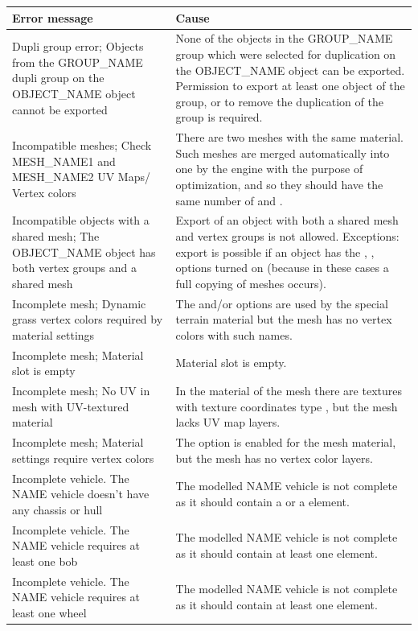 \documentclass[a4paper,12pt,oneside]{sphinxmanual}
\begin{document}
\begin{tabulary}{\linewidth}{|L|L|}
\hline
\textsf{\relax 
Error message
} & \textsf{\relax 
Cause
}\\
\hline
Dupli group error; Objects from
the GROUP\_NAME dupli group on
the OBJECT\_NAME object cannot be
exported
 & 
None of the objects in the GROUP\_NAME group which were selected for duplication on the OBJECT\_NAME object can be exported. Permission to export at least one object of the group, or to remove the duplication of the group is required.
\\

Incompatible meshes; Check
MESH\_NAME1 and MESH\_NAME2 UV Maps/
Vertex colors
 & 
There are two meshes with the same material. Such meshes are merged automatically into one by the engine with the purpose of optimization, and so they should have the same number of  and .
\\

Incompatible objects with
a shared mesh; The OBJECT\_NAME
object has both vertex groups and
a shared mesh
 & 
Export of an object with both a shared mesh and vertex groups is not allowed. Exceptions: export is possible if an object has the , ,  options turned on (because in these cases a full copying of meshes occurs).
\\

Incomplete mesh; Dynamic grass
vertex colors required
by material settings
 & 
The  and/or  options are used by the special terrain material but the mesh has no vertex colors with such names.
\\

Incomplete mesh; Material slot is
empty
 & 
Material slot is empty.
\\

Incomplete mesh; No UV in mesh
with UV-textured material
 & 
In the material of the mesh there are textures with texture coordinates type , but the mesh lacks UV map layers.
\\

Incomplete mesh; Material settings
require vertex colors
 & 
The  option is enabled for the mesh material, but the mesh has no vertex color layers.
\\

Incomplete vehicle. The NAME
vehicle doesn't have any chassis
or hull
 & 
The modelled NAME vehicle is not complete as it should contain a  or a  element.
\\

Incomplete vehicle. The NAME
vehicle requires at least one bob
 & 
The modelled NAME vehicle is not complete as it should contain at least one  element.
\\

Incomplete vehicle. The NAME
vehicle requires at least one wheel
 & 
The modelled NAME vehicle is not complete as it should contain at least one  element.
\\
\hline\end{tabulary}
\end{document}
